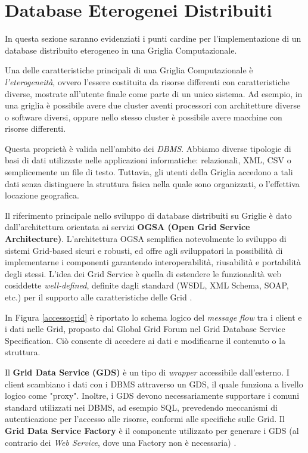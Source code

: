 \documentclass[11pt]{article}
\begin{document}
\section{Database Eterogenei Distribuiti}

In questa sezione saranno evidenziati i punti cardine per l'implementazione di un database distribuito eterogeneo in una Griglia Computazionale.

Una delle caratteristiche principali di una Griglia Computazionale è \emph{l'eterogeneità}, ovvero l'essere costituita da risorse differenti con caratteristiche diverse, mostrate all'utente finale come parte di un unico sistema. Ad esempio, in una griglia è possibile avere due cluster aventi processori con architetture diverse o software diversi, oppure nello stesso cluster è possibile avere macchine con risorse differenti.

Questa proprietà è valida nell'ambito dei \emph{DBMS}. Abbiamo diverse tipologie di basi di dati utilizzate nelle applicazioni informatiche: relazionali, XML, CSV o semplicemente un file di testo. Tuttavia, gli utenti della Griglia accedono a tali dati senza distinguere la struttura fisica nella quale sono organizzati, o l'effettiva locazione geografica.

Il riferimento principale nello sviluppo di database distribuiti su Griglie è dato dall'architettura orientata ai servizi \textbf{OGSA (Open Grid Service Architecture)}. L'architettura OGSA semplifica notevolmente lo sviluppo di sistemi Grid-based sicuri e robusti, ed offre agli sviluppatori la possibilità di implementarne i componenti garantendo interoperabilità, riusabilità e portabilità degli stessi. L'idea dei Grid Service è quella di estendere le funzionalità web cosiddette \emph{well-defined}, definite dagli standard (WSDL, XML Schema, SOAP, etc.) per il supporto alle caratteristiche delle Grid \cite{2} \cite{3}. 

In Figura \ref{accessogrid} è riportato lo schema logico del \emph{message flow} tra i client e i dati nelle Grid, proposto dal Global Grid Forum nel Grid Database Service Specification. Ciò consente di accedere ai dati e modificarne il contenuto o la struttura. 

Il \textbf{Grid Data Service (GDS)} è un tipo di \emph{wrapper} accessibile dall'esterno. I client scambiano i dati con i DBMS attraverso un GDS, il quale funziona a livello logico come "proxy". Inoltre, i GDS devono necessariamente supportare i comuni standard utilizzati nei DBMS, ad esempio SQL, prevedendo meccanismi di autenticazione per l'accesso alle risorse, conformi alle specifiche sulle Grid. Il \textbf{Grid Data Service Factory} è il componente utilizzato per generare i GDS (al contrario dei \emph{Web Service}, dove una Factory non è necessaria) \cite{3}. 
\end{document}
